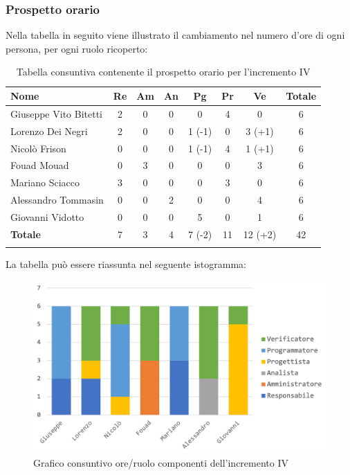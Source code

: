 		\subsubsection{Prospetto orario}
			Nella tabella in seguito viene illustrato il cambiamento nel numero d'ore di ogni persona, per ogni ruolo ricoperto:
			
			\begin{longtable}{|l|c|c|c|c|c|c|c|}
				\hline
				\rowcolor{lighter-grayer}
				\textbf{Nome} & \textbf{Re} & \textbf{Am} & \textbf{An} & \textbf{Pg}  & \textbf{Pr}   & \textbf{Ve} & \textbf{Totale} \\
				\hline
				\endfirsthead
				\hline
				Giuseppe Vito Bitetti & 2 & 0 & 0 & 0 & 4 & 0 & 6\\
				\hline
				\hline
				Lorenzo Dei Negri & 2 & 0 & 0 & 1 (-1) & 0 & 3 (+1) & 6\\
				\hline
				\hline
				Nicolò Frison & 0 & 0 & 0 & 1 (-1) & 4 & 1 (+1) & 6\\
				\hline
				\hline
				Fouad Mouad & 0 & 3 & 0 & 0 & 0 & 3 & 6\\
				\hline
				\hline
				Mariano Sciacco & 3 & 0 & 0 & 0 & 3 & 0 & 6\\
				\hline
				\hline
				Alessandro Tommasin & 0 & 0 & 2 & 0 & 0 & 4 & 6\\
				\hline
				\hline
				Giovanni Vidotto & 0 & 0 & 0 & 5 & 0 & 1 & 6\\
				\hline 
				\textbf{Totale} & 7 &  3 & 4 & 7 (-2) & 11  & 12 (+2) & 42 \\
				\hline 
				
				\caption{Tabella consuntiva contenente il prospetto orario per l'incremento IV}
			\end{longtable}
		\pagebreak
			
			La tabella può essere riassunta nel seguente istogramma:
			
			\begin{figure}[H]
				\centering
				\includegraphics[width=0.8\linewidth]{images/consuntivo/ConsIncr4-1.png}
				\caption{Grafico consuntivo ore/ruolo componenti dell'incremento IV}
				\label{fig:consuntivo grafico suddivisione ruoli incremento IV}
			\end{figure}
			
